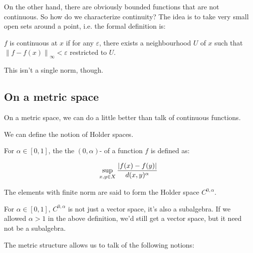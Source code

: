 \documentclass[a4paper]{amsart}
\newcommand{\norm}[1]{\left\|#1\right\|}
\begin{document}
On the other hand, there are obviously bounded functions that are not
continuous. So how do we characterize continuity? The idea is to take
very small open sets around a point, i.e. the formal definition is:

$f$ is continuous at $x$ if for any $\varepsilon$, there exists a
neighbourhood $U$ of $x$ such that $\norm{f - f(x)}_\infty <
\varepsilon$ restricted to $U$.

This isn't a single norm, though.

\subsection{On a metric space}

On a metric space, we can do a little better than talk of continuous
functions. 

We can define the notion of Holder spaces.

\begin{definer}
  For $\alpha \in [0,1]$, the the $(0,\alpha)$- of a function $f$ is defined as:

  $$\sup_{x,y \in X} \frac{\left|f(x) - f(y)\right|}{d(x,y)^\alpha}$$

  The elements with finite norm are said to form the Holder space
  $C^{0,\alpha}$.
\end{definer}

For $\alpha \in [0,1]$, $C^{0,\alpha}$ is not just a vector space,
it's also a subalgebra. If we allowed $\alpha > 1$ in the above
definition, we'd still get a vector space, but it need not be a
subalgebra.

The metric structure allows us to talk of the following notions:
\end{document}
